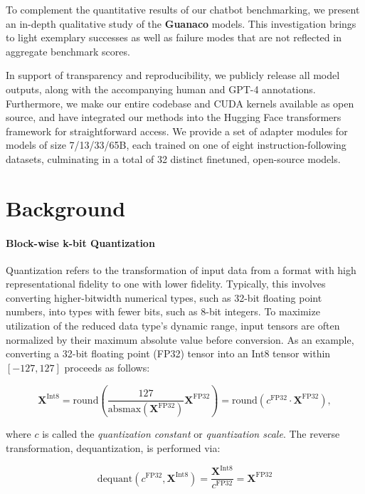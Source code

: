 To complement the quantitative results of our chatbot benchmarking, we present an in-depth qualitative study of the \textbf{Guanaco} models. This investigation brings to light exemplary successes as well as failure modes that are not reflected in aggregate benchmark scores.

In support of transparency and reproducibility, we publicly release all model outputs, along with the accompanying human and GPT-4 annotations. Furthermore, we make our entire codebase and CUDA kernels available as open source, and have integrated our methods into the Hugging Face transformers framework \citep{wolf2019huggingface} for straightforward access. We provide a set of adapter modules for models of size 7/13/33/65B, each trained on one of eight instruction-following datasets, culminating in a total of 32 distinct finetuned, open-source models.

\section{Background}
\paragraph{Block-wise k-bit Quantization} Quantization refers to the transformation of input data from a format with high representational fidelity to one with lower fidelity. Typically, this involves converting higher-bitwidth numerical types, such as 32-bit floating point numbers, into types with fewer bits, such as 8-bit integers. To maximize utilization of the reduced data type’s dynamic range, input tensors are often normalized by their maximum absolute value before conversion. As an example, converting a 32-bit floating point (FP32) tensor into an Int8 tensor within $[-127, 127]$ proceeds as follows:

\begin{equation}
    \mathbf{X}^{ \text{Int8}} = \text{round}\left( \frac{127}{{\text{absmax}}(\mathbf{X}^{{\text{FP32}}})}\mathbf{X}^{{\text{FP32}}} \right) = \text{round}(c^{\text{FP32}}\cdot \mathbf{X}^{{\text{FP32}}}),
\end{equation}

where $c$ is called the {\em quantization constant} or {\em quantization scale}. The reverse transformation, dequantization, is performed via:

\begin{equation}
    \text{dequant}(c^{\text{FP32}}, \mathbf{X}^{\text{Int8}}) = \frac{\mathbf{X}^{\text{Int8}}}{c^{\text{FP32}}} = \mathbf{X}^{\text{FP32}}
\end{equation}

